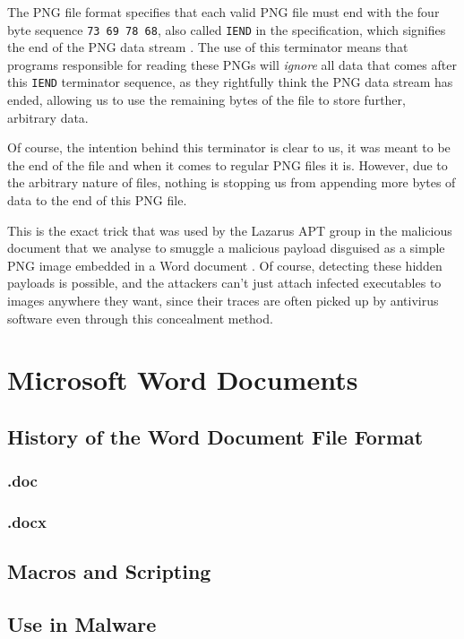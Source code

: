 The \acrshort{PNG} file format specifies that each valid \acrshort{PNG} file must end with the four byte sequence 
\verb+73 69 78 68+, also called \verb+IEND+ in the specification, which signifies the end of the PNG data stream 
\cite{png-standard}. The use of this terminator means that programs responsible for reading these \acrshort{PNG}s 
will \emph{ignore} all data that comes after this \verb+IEND+ terminator sequence, as they rightfully think the
\acrshort{PNG} data stream has ended, allowing us to use the remaining bytes of the file to store further,
arbitrary data. 

Of course, the intention behind this terminator is clear to us, it was meant to be the end of the file and when it comes
to regular \acrshort{PNG} files it is. However, due to the arbitrary nature of files, nothing is stopping us from 
appending more bytes of data to the end of this \acrshort{PNG} file.

This is the exact trick that was used by the Lazarus \acrshort{APT} group in the malicious document that we analyse to
smuggle a malicious payload disguised as a simple \acrshort{PNG} image embedded in a Word document \cite{jazi-article}.
Of course, detecting these hidden payloads is possible, and the attackers can't just attach infected executables to
images anywhere they want, since their traces are often picked up by antivirus software even through this concealment
method.

\section{Microsoft Word Documents}
  

\subsection{History of the Word Document File Format}
\subsubsection{.doc}
\subsubsection{.docx}
\subsection{Macros and Scripting}
\subsection{Use in Malware}

